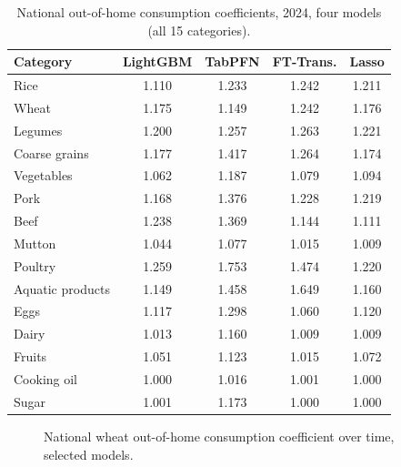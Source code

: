 \documentclass[12pt,a4paper]{article}
\begin{document}
\begin{table}[htbp]
\centering
\caption{National out-of-home consumption coefficients, 2024, four models (all 15 categories).}
\label{tab:app_2024_all_models}
\small
\begin{tabular}{lcccc}
\toprule
Category & LightGBM & TabPFN & FT-Trans. & Lasso \\
\midrule
Rice & 1.110 & 1.233 & 1.242 & 1.211 \\
Wheat & 1.175 & 1.149 & 1.242 & 1.176 \\
Legumes & 1.200 & 1.257 & 1.263 & 1.221 \\
Coarse grains & 1.177 & 1.417 & 1.264 & 1.174 \\
Vegetables & 1.062 & 1.187 & 1.079 & 1.094 \\
Pork & 1.168 & 1.376 & 1.228 & 1.219 \\
Beef & 1.238 & 1.369 & 1.144 & 1.111 \\
Mutton & 1.044 & 1.077 & 1.015 & 1.009 \\
Poultry & 1.259 & 1.753 & 1.474 & 1.220 \\
Aquatic products & 1.149 & 1.458 & 1.649 & 1.160 \\
Eggs & 1.117 & 1.298 & 1.060 & 1.120 \\
Dairy & 1.013 & 1.160 & 1.009 & 1.009 \\
Fruits & 1.051 & 1.123 & 1.015 & 1.072 \\
Cooking oil & 1.000 & 1.016 & 1.001 & 1.000 \\
Sugar & 1.001 & 1.173 & 1.000 & 1.000 \\
\bottomrule
\end{tabular}
\end{table}

\begin{figure}[htbp]
\centering
{}
\caption{National wheat out-of-home consumption coefficient over time, selected models.}
\label{fig:app_wheat_trend}
\end{figure}
\end{document}
